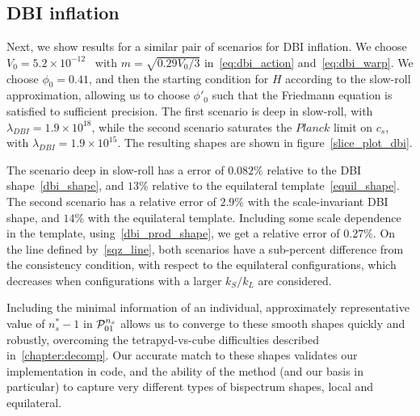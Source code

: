 \subsection{DBI inflation}
Next, we show results for a similar pair of scenarios for DBI inflation.
We choose $V_{0}={5.2\times10^{-12}}$~%
with $m=\sqrt{0.29V_0/3}$
in~\eqref{eq:dbi_action} and~\eqref{eq:dbi_warp}.
We choose $\phi_0=0.41$, and then the starting condition
for $H$ according to the slow-roll approximation,
allowing us to choose $\phi'_0$ such that the Friedmann
equation is satisfied to sufficient precision.
The first scenario is deep in slow-roll, with $\lambda_{DBI}=1.9\times10^{18}$, while
the second scenario saturates the $\textit{Planck}$
limit on $c_s$, with $\lambda_{DBI}=1.9\times10^{15}$.
The resulting shapes are shown in figure~\ref{slice_plot_dbi}.


The scenario deep in slow-roll has a error of $0.082\%$
relative to the DBI shape~\eqref{dbi_shape},
and $13\%$
relative to the equilateral template~\eqref{equil_shape}.
The second scenario has a relative error of $2.9\%$
with the scale-invariant DBI shape, and $14\%$ with the equilateral template.
Including some scale dependence in the template,
using~\eqref{dbi_prod_shape}, we get a relative error of $0.27\%$.
On the line defined by~\eqref{sqz_line},
both scenarios have a sub-percent difference from the
consistency condition, with respect to the equilateral configurations,
which decreases when configurations with a larger $k_S/k_L$ are considered.

Including the minimal information of an individual, approximately
representative value of $n_s^{*}-1$
in $\mathcal{P}^{n_s}_{01}$ allows us to converge to these smooth shapes quickly
and robustly, overcoming the tetrapyd-vs-cube difficulties described
in~\ref{chapter:decomp}. Our accurate match to these shapes validates our
implementation in code, and the ability of the method
(and our basis in particular) to capture very different types of
bispectrum shapes, local and equilateral.


